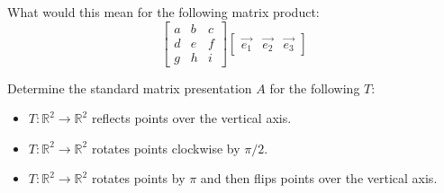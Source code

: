 What would this mean for the following matrix product: $$\begin{bmatrix} a&b&c\\d&e&f\\g&h&i \end{bmatrix} \begin{bmatrix} \vec{e_1}&\vec{e_2}&\vec{e_3} \end{bmatrix}$$
\eq

\bq Determine the standard matrix presentation $A$ for the following $T$:
\begin{itemize}
\item $T: \mathbb{R}^2 \to \mathbb{R}^2$ reflects points over the vertical axis.
\item $T: \mathbb{R}^2 \to \mathbb{R}^2$ rotates points clockwise by $\pi/2$.
\item $T: \mathbb{R}^2 \to \mathbb{R}^2$ rotates points by $\pi$ and then flips points over the vertical axis.
\end{itemize}
\eq

